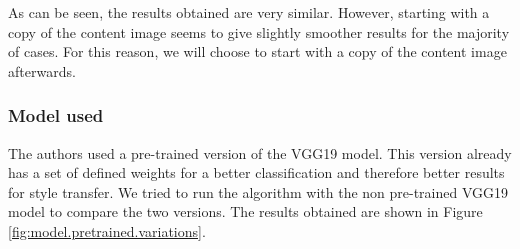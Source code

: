 \documentclass[twocolumn,superscriptaddress,aps,floatfix, nofootinbib]{revtex4-1}
\begin{document}
    As can be seen, the results obtained are very similar. However, starting with a copy of the content image seems to give slightly smoother results for the majority of cases. For this reason, we will choose to start with a copy of the content image afterwards.
    
    \subsubsection{Model used}
    
    The authors used a pre-trained version of the VGG19 model. This version already has a set of defined weights for a better classification and therefore better results for style transfer. We tried to run the algorithm with the non pre-trained VGG19 model to compare the two versions. The results obtained are shown in Figure \ref{fig:model.pretrained.variations}.
    
\end{document}
